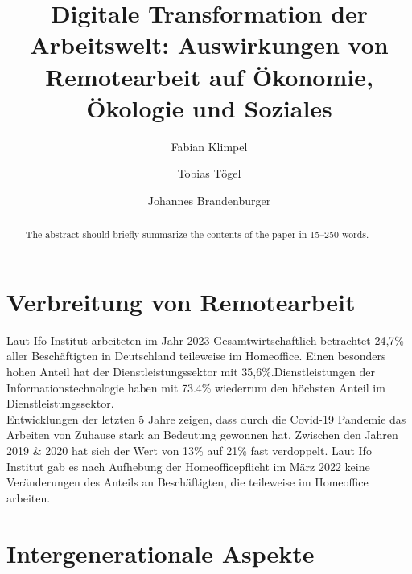 \documentclass[runningheads]{llncs}
\begin{document}
\title{Digitale Transformation der Arbeitswelt: Auswirkungen von Remotearbeit auf Ökonomie, Ökologie und Soziales}


\author{Fabian Klimpel\orcidID{} \and
Tobias Tögel\orcidID{} \and
Johannes Brandenburger\orcidID{}}
%


\maketitle

\begin{abstract}
The abstract should briefly summarize the contents of the paper in
15--250 words.


\end{abstract}

\section{Verbreitung von Remotearbeit}
Laut Ifo Institut arbeiteten im Jahr 2023 Gesamtwirtschaftlich betrachtet 24,7\% aller Beschäftigten in Deutschland teileweise im Homeoffice\cite{ifo23}. Einen besonders hohen Anteil hat der Dienstleistungssektor mit 35,6\%\cite{ifo23}.Dienstleistungen der Informationstechnologie haben mit 73.4\% wiederrum den höchsten Anteil im Dienstleistungssektor\cite{ifo23}.\\
Entwicklungen der letzten 5 Jahre zeigen, dass durch die Covid-19 Pandemie das Arbeiten von Zuhause stark an Bedeutung gewonnen hat. Zwischen den Jahren 2019 \& 2020 hat sich der Wert von 13\% auf 21\% fast verdoppelt\cite{statis23}. Laut Ifo Institut gab es nach Aufhebung der Homeofficepflicht im März 2022 keine Veränderungen des Anteils an Beschäftigten, die teileweise im Homeoffice arbeiten\cite{ifo23}.

\section{Intergenerationale Aspekte}
\end{document}
